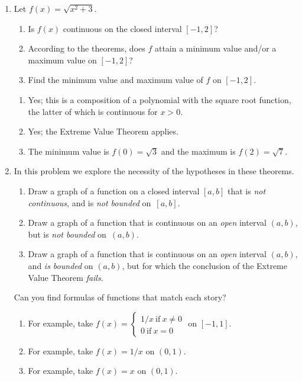 \documentclass[12pt]{amsart}
\numberwithin{equation}{section}
\theoremstyle{plain} %
\theoremstyle{definition}
\theoremstyle{remark}
\begin{document}
\begin{enumerate}



\item Let $f(x)=\sqrt{x^2+3}$.
\begin{enumerate}
\item Is $f(x)$ continuous on the closed interval $[-1,2]$?
\item According to the theorems, does $f$ attain a minimum value and/or a maximum value on $[-1,2]$?
\item Find the minimum value and maximum value of $f$ on $[-1,2]$.
\end{enumerate}

\begin{framed}
\begin{enumerate}
\item Yes; this is a composition of a polynomial with the square root function, the latter of which is continuous for $x>0$.
\item Yes; the Extreme Value Theorem applies.
\item The minimum value is $f(0)=\sqrt{3}$ and the maximum is $f(2)=\sqrt{7}$.
\end{enumerate}
\end{framed}

\item In this problem we explore the necessity of the hypotheses in these theorems.
\begin{enumerate}
\item Draw a graph of a function on a closed interval $[a,b]$ that is \emph{not continuous}, and is \emph{not bounded} on~$[a,b]$.
\item Draw a graph of a function that is continuous on an \emph{open} interval $(a,b)$, but is \emph{not bounded} on~$(a,b)$.
\item Draw a graph of a function that is continuous on an \emph{open} interval $(a,b)$, and \emph{is bounded} on $(a,b)$, but for which the conclusion of the Extreme Value Theorem \emph{fails}.
\end{enumerate}
Can you find formulas of functions that match each story?

\begin{framed}
\begin{enumerate}
\item For example, take $f(x)=\begin{cases} 1/x \ \text{if} \ x\neq 0 \\ 0  \ \text{if} \ x= 0\end{cases}$ on $[-1,1]$.
\item For example, take $f(x)=1/x$ on $(0,1)$.
\item For example, take $f(x)=x$ on $(0,1)$.
\end{enumerate}
\end{framed}
   

\end{enumerate}
\end{document}
